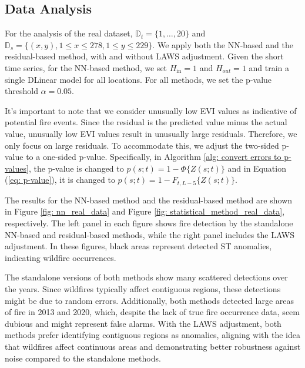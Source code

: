 \documentclass[11pt]{article}
\begin{document}
\subsection{Data Analysis}
For the analysis of the real dataset, $\mathbb{D}_t=\{1, \ldots, 20\}$ and $\mathbb{D}_s=\{(x, y), 1 \leq x \leq 278, 1 \leq y \leq 229\}$. We apply both the NN-based and the residual-based method, with and without LAWS adjustment. Given the short time series, for the NN-based method, we set $H_{\mathrm{in}}=1$ and $H_{out}=1$ and train a single DLinear model for all locations. For all methods, we set the p-value threshold $\alpha=0.05$.

 It's important to note that we consider unusually low EVI values as indicative of potential fire events. Since the residual is the predicted value minus the actual value, unusually low EVI values result in unusually large residuals. Therefore, we only focus on large residuals. To accommodate this, we adjust the two-sided p-value to a one-sided p-value. Specifically, in Algorithm \ref{alg: convert errors to p-values}, the p-value is changed to $p(s;t)= 1-\Phi\{Z(s;t)\}$ and in Equation (\ref{eq: p-value}), it is changed to $p(s;t)= 1-F_{t,L-5}\{Z(s;t)\}$.




The results for the NN-based method and the residual-based method are shown in Figure \ref{fig: nn_real_data} and Figure \ref{fig: statistical_method_real_data}, respectively. The left panel in each figure shows fire detection by the standalone NN-based and residual-based methods, while the right panel includes the LAWS adjustment. In these figures, black areas represent detected ST anomalies, indicating wildfire occurrences.

The standalone versions of both methods show many scattered detections over the years. Since wildfires typically affect contiguous regions, these detections might be due to random errors. Additionally, both methods detected large areas of fire in 2013 and 2020, which, despite the lack of true fire occurrence data, seem dubious and might represent false alarms. With the LAWS adjustment, both methods prefer identifying contiguous regions as anomalies, aligning with the idea that wildfires affect continuous areas and demonstrating better robustness against noise compared to the standalone methods.
\end{document}

